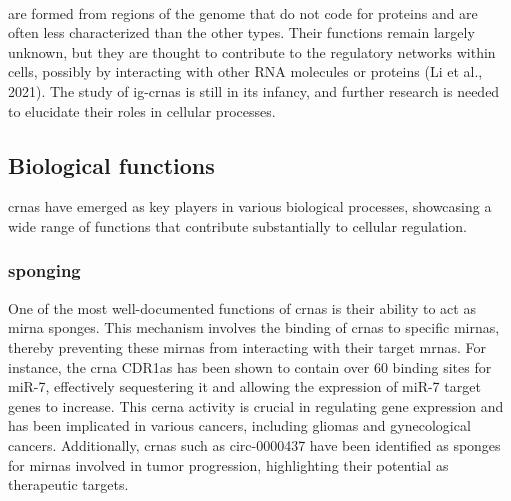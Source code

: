 \paragraph{} are formed from regions of
the
genome
that do not code for proteins and are often less characterized than the other
types.
Their functions remain largely unknown, but they are thought to contribute to
the regulatory networks within cells, possibly by interacting with other RNA
molecules or proteins (Li et al., 2021).
The study of \glspl{ig-crna} is still in its infancy, and further research is
needed to elucidate their roles in cellular processes.

\subsection{Biological functions}
\label{sec:circrna_functions}
\glspl{crna} have emerged as key players in various biological processes,
showcasing
a wide range of functions that contribute substantially to cellular regulation.

\subsubsection{ sponging}
One of the most well-documented functions of \glspl{crna} is their ability to
act as \gls{mirna} sponges.
This mechanism involves the binding of \glspl{crna} to specific \glspl{mirna},
thereby preventing these \glspl{mirna} from interacting with their target
\glspl{mrna}.
For instance, the \gls{crna} CDR1as has been shown to contain over 60 binding
sites for miR-7, effectively sequestering it and allowing the expression of
miR-7 target genes to
increase\supercite{guo_expanded_2014,yuan_regulatory_2020}.
This \gls{cerna} activity is crucial in regulating gene expression and has been
implicated in various cancers, including gliomas and gynecological
cancers\supercite{dong_expression_2020,song_circular_2016}.
Additionally, \glspl{crna} such as circ-0000437 have been identified as sponges
for \glspl{mirna} involved in tumor progression, highlighting their potential
as therapeutic targets\supercite{li_peptide_2021,cui_circular_2022}.

